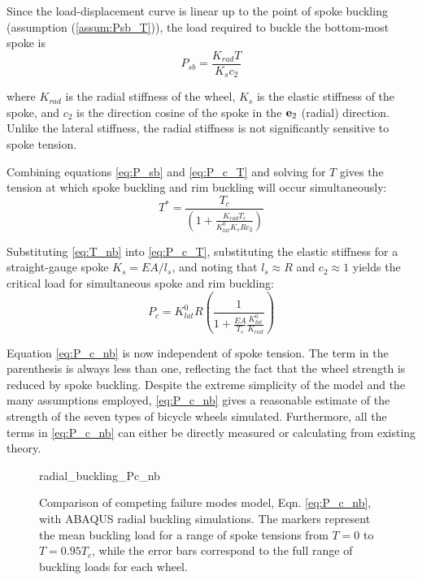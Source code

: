 \documentclass[\rootdir/thesis.tex]{subfiles}
\begin{document}
Since the load-displacement curve is linear up to the point of spoke buckling (assumption (\ref{assum:Psb_T})), the load required to buckle the bottom-most spoke is
\begin{equation}
\label{eq:P_sb}
P_{sb} = \frac{K_{rad}T}{K_s c_2}
\end{equation}

where $K_{rad}$ is the radial stiffness of the wheel, $K_s$ is the elastic stiffness of the spoke, and $c_2$ is the direction cosine of the spoke in the $\mathbf{e}_2$ (radial) direction. Unlike the lateral stiffness, the radial stiffness is not significantly sensitive to spoke tension.

Combining equations \eqref{eq:P_sb} and \eqref{eq:P_c_T} and solving for $T$ gives the tension at which spoke buckling and rim buckling will occur simultaneously:
\begin{equation}
\label{eq:T_nb}
T^* = \frac{T_c}{\left(1 + \frac{K_{rad}T_c}{K_{lat}^0 K_s R c_2}\right)}
\end{equation}

Substituting \eqref{eq:T_nb} into \eqref{eq:P_c_T}, substituting the elastic stiffness for a straight-gauge spoke $K_s=EA/l_s$, and noting that $l_s \approx R$ and $c_2\approx 1$ yields the critical load for simultaneous spoke and rim buckling:
\begin{equation}
\label{eq:P_c_nb}
P_c = K_{lat}^0 R \left(\frac{1}{1 + \frac{EA}
						{T_c}\frac{K_{lat}^0}{K_{rad}}}\right)
\end{equation}

Equation \eqref{eq:P_c_nb} is now independent of spoke tension. The term in the parenthesis is always less than one, reflecting the fact that the wheel strength is reduced by spoke buckling. Despite the extreme simplicity of the model and the many assumptions employed, \eqref{eq:P_c_nb} gives a reasonable estimate of the strength of the seven types of bicycle wheels simulated. Furthermore, all the terms in \eqref{eq:P_c_nb} can either be directly measured or calculating from existing theory.

\begin{figure}[h]
\centering
{radial_buckling_Pc_nb}
\caption{Comparison of competing failure modes model, Eqn. \eqref{eq:P_c_nb}, with ABAQUS radial buckling simulations. The markers represent the mean buckling load for a range of spoke tensions from $T=0$ to $T=0.95T_c$, while the error bars correspond to the full range of buckling loads for each wheel.}
\label{fig:Pc_rad_theory_comp}
\end{figure}
\end{document}
